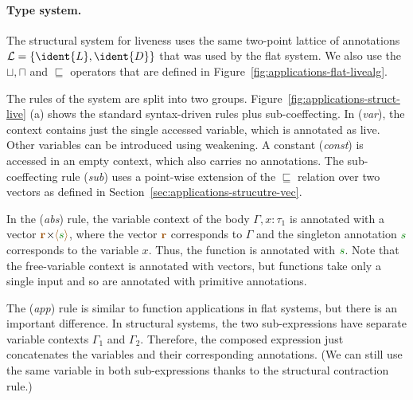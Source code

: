 \paragraph{Type system.}
The structural system for liveness uses the same two-point lattice of annotations
$\mathcal{L}=\{ \ident{L}, \ident{D} \}$ that was used by the flat system. We also use the
$\sqcup, \sqcap$ and $\sqsubseteq$ operators that are defined in Figure~\ref{fig:applications-flat-livealg}.

The rules of the system are split into two groups. Figure~\ref{fig:applications-struct-live} (a) shows 
the standard syntax-driven rules plus sub-coeffecting. In (\emph{var}), the context contains just the 
single accessed variable, which is annotated as live. Other variables can be introduced using weakening. 
A constant (\emph{const}) is accessed in an empty context, which also carries no annotations. The
sub-coeffecting rule (\emph{sub}) uses a point-wise extension of the $\sqsubseteq$ relation over two
vectors as defined in Section~\ref{sec:applications-strucutre-vec}.

In the (\emph{abs}) rule, the variable context of the body $\Gamma, x\!:\!\tau_1$ is annotated with
a vector $\mathbf{\aclrd{r}}\cons\alift{\cclrd{s}}$, where the vector $\mathbf{\aclrd{r}}$ corresponds
to $\Gamma$ and the singleton annotation $\cclrd{s}$ corresponds to the variable $x$. Thus, the
function is annotated with $\cclrd{s}$. Note that the free-variable context is annotated with vectors,
but functions take only a single input and so are annotated with primitive annotations.

The (\emph{app}) rule is similar to function applications in flat systems, but there is an important
difference. In structural systems, the two sub-expressions have separate variable contexts
$\Gamma_1$ and $\Gamma_2$. Therefore, the composed expression just concatenates the variables
and their corresponding annotations. (We can still use the same variable in both sub-expressions
thanks to the structural contraction rule.) 

